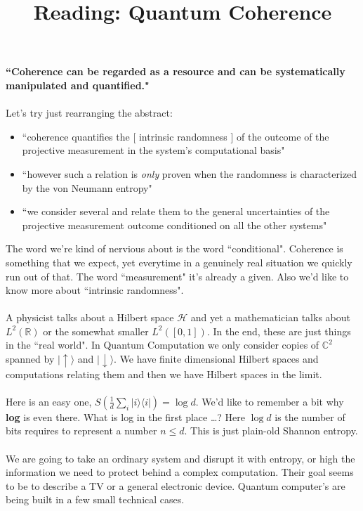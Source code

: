 \documentclass[12pt]{article}
\title{Reading: Quantum Coherence}
\date{}
\begin{document}
\sffamily

\maketitle

\noindent \textbf{``Coherence can be regarded as a resource and can be systematically manipulated and quantified."} \\ \\
Let's try just rearranging the abstract:
\begin{itemize}
\item ``coherence quantifies the [ intrinsic randomness ] of the outcome of the projective measurement in the system's computational basis"
\item ``however such a relation is \textit{only} proven when the randomness is characterized by the von Neumann entropy"
\item ``we consider several \textbf{\color{blue!70!black}{recently proposed coherence measures}} and relate them to the general uncertainties of the projective measurement outcome conditioned on all the other systems"
\end{itemize}
The word we're kind of nervious about is the word ``conditional".  Coherence is something that we expect, yet everytime in a genuinely real situation we quickly run out of that.  The word ``measurement" it's already a given. Also we'd like to know more about ``intrinsic randomness". \\ \\
A physicist talks about a Hilbert space $\mathcal{H}$ and yet a mathematician talks about $L^2(\mathbb{R})$ or the somewhat smaller $L^2([0,1])$.  In the end, these are just things in the ``real world".  In Quantum Computation we only consider copies of $\mathbb{C}^2$ spanned by $|\uparrow \rangle$ and $|\downarrow \rangle$.   We have finite dimensional Hilbert spaces and computations relating them and then we have Hilbert spaces in the limit. \\ \\
Here is an easy one, $S( \frac{1}{d} \sum_i | i \rangle \langle i |) = \log d$.  We'd like to remember a bit why \textbf{log} is even there.  What is log in the first place \dots?  Here $\log d$ is the number of bits requires to represent a number $n \leq d$.  This is just plain-old Shannon entropy. \\ \\
We are going to take an ordinary system and disrupt it with entropy, or high the information we need to protect behind a complex computation. Their goal seems to be to describe a TV or a general electronic device.  Quantum computer's are being built in a few small technical cases.
\end{document}
